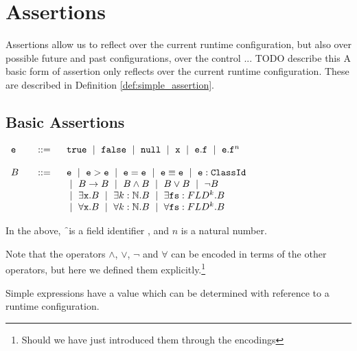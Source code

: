 \section{ Assertions}

Assertions allow us to reflect over the current runtime configuration, but also over possible future and past configurations, over 
the control ... TODO describe this
A basic form of assertion only reflects over the current runtime configuration. These are described in Definition \ref{def:simple_assertion}.
 
 \subsection{Basic Assertions}
 \label{def:basic_assertion}
 \begin{definition} $ $ \\
 
 $\begin{array}{lcl}
 \SE & ::= &  \prg{true}  \ \mid\ \prg{false}  \    \mid\ \prg{null}  \ \mid \ \x  \ \mid \ \SE.\f    \ \mid \ \SE.\f^n \  \\
 ~ \\
  \SA\ &\ \  ::=\ \  & \SE  \ \mid \ \SE > \SE \ \mid \  \SE=\SE  \ \mid \ \SE \equiv \SE \  \mid \   \SE:\prg{ClassId}    \\  
& & \ \mid  \ \SA \rightarrow \SA \ \mid  \ \SA \wedge \SA  \ \mid  \ \SA \vee \SA  \ \mid  \ \neg \SA \\
& & \ \mid \   \exists \prg{x}.\SA   %
  \ \mid \  \exists k:\mathbb{N}.\SA  
  \ \mid \  \exists \prg{fs}:FLD^k.\SA \\
& & \ \mid \   \forall \prg{x}.\SA   %
  \ \mid \  \forall k:\mathbb{N}.\SA  
  \ \mid \  \forall \prg{fs}:FLD^k.\SA  
\end{array}$


\noindent
In the above, \f\  is a field identifier , and  $n$ is a natural number.
\end{definition} 

Note that the operators $\wedge$, $\vee$, $\neg$ and $\forall$ can be encoded in terms of the other operators, but here we defined them explicitly.\footnote{Should we have just introduced them through the encodings} 

Simple expressions have a value which can be determined with reference to a runtime configuration.

